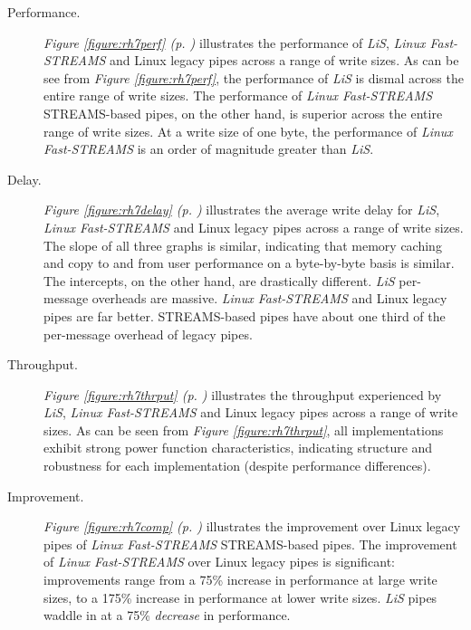 \documentclass[letterpaper,final,notitlepage,twocolumn,10pt,twoside]{article}
\begin{document}
\begin{description}

\item[Performance.]

\textit{Figure \ref{figure:rh7perf} (p. \pageref{figure:rh7perf})} illustrates
the performance of \textsl{LiS}, \textsl{Linux Fast-STREAMS} and Linux legacy
pipes across a range of write sizes.  As can be see from \textit{Figure
\ref{figure:rh7perf}}, the performance of \textsl{LiS} is dismal across the
entire range of write sizes.  The performance of \textsl{Linux Fast-STREAMS}
STREAMS-based pipes, on the other hand, is superior across the entire range of
write sizes.  At a write size of one byte, the performance of \textsl{Linux
Fast-STREAMS} is an order of magnitude greater than \textsl{LiS}.

\item[Delay.]

\textit{Figure \ref{figure:rh7delay} (p. \pageref{figure:rh7delay})}
illustrates the average write delay for \textsl{LiS}, \textsl{Linux
Fast-STREAMS} and Linux legacy pipes across a range of write sizes.  The slope
of all three graphs is similar, indicating that memory caching and copy to and
from user performance on a byte-by-byte basis is similar.  The intercepts, on
the other hand, are drastically different.  \textsl{LiS} per-message overheads
are massive.  \textsl{Linux Fast-STREAMS} and Linux legacy pipes are far
better.  STREAMS-based pipes have about one third of the per-message overhead
of legacy pipes.

\item[Throughput.]

\textit{Figure \ref{figure:rh7thrput} (p.  \pageref{figure:rh7thrput})}
illustrates the throughput experienced by \textsl{LiS}, \textsl{Linux
Fast-STREAMS} and Linux legacy pipes across a range of write sizes.  As can be
seen from \textit{Figure \ref{figure:rh7thrput}}, all implementations exhibit
strong power function characteristics, indicating structure and robustness for
each implementation (despite performance differences).

\item[Improvement.]

\textit{Figure \ref{figure:rh7comp} (p. \pageref{figure:rh7comp})} illustrates
the improvement over Linux legacy pipes of \textsl{Linux Fast-STREAMS}
STREAMS-based pipes.  The improvement of \textsl{Linux Fast-STREAMS} over
Linux legacy pipes is significant: improvements range from a 75\% increase in
performance at large write sizes, to a 175\% increase in performance at lower
write sizes.  \textsl{LiS} pipes waddle in at a 75\% {\em decrease} in
performance.

\end{description}
\end{document}
